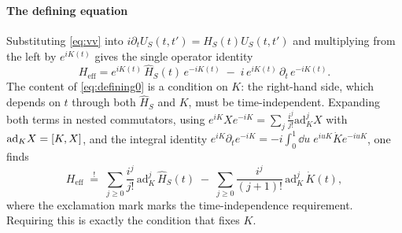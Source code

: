 \documentclass[a4paper,11pt]{article}
\newcommand{\eff}{\mathrm{eff}}
\newcommand{\ad}{\mathrm{ad}}
\begin{document}
\paragraph{The defining equation}
Substituting \cref{eq:vv} into $i\partial_t U_S(t,t') = \hat H_S(t)U_S(t,t')$ and multiplying from the left by $e^{iK(t)}$ gives the single operator identity
\begin{equation}\label{eq:defining0}
  H_\eff = e^{iK(t)}\,\hat H_S(t)\,e^{-iK(t)} \;-\; i\,e^{iK(t)}\,\partial_t\, e^{-iK(t)} .
\end{equation}
The content of \cref{eq:defining0} is a condition on $K$: the right-hand side, which depends on $t$ through both $\hat H_S$ and $K$, must be time-independent. Expanding both terms in nested commutators, using $e^{iK}Xe^{-iK} = \sum_j \frac{i^j}{j!}\ad_K^j X$ with $\ad_K X = \comm{K}{X}$, and the integral identity $e^{iK}\partial_t e^{-iK} = -i\int_0^1\dd u\; e^{iuK}\dot K e^{-iuK}$, one finds
\begin{equation}\label{eq:defining}
  H_\eff
  \;\overset{!}{=}\;
  \sum_{j\ge0}\frac{i^j}{j!}\,\ad_K^j\,\hat H_S(t)
  \;-\;
  \sum_{j\ge0}\frac{i^j}{(j+1)!}\,\ad_K^j\,\dot K(t),
\end{equation}
where the exclamation mark marks the time-independence requirement. Requiring this is exactly the condition that fixes $K$.
\end{document}
